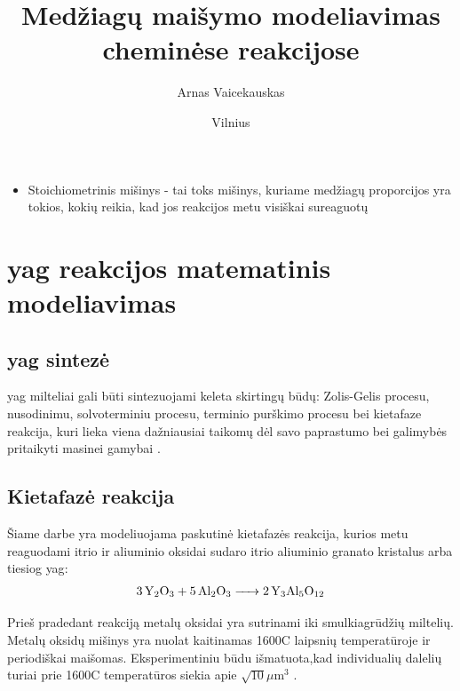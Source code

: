 \documentclass{VUMIFInfKursinis}
\institute{Informatikos institutas}  %
\title{Medžiagų maišymo modeliavimas cheminėse
reakcijose}
\author{Arnas Vaicekauskas}
\date{Vilnius \\ \the\year}
\begin{document}
\maketitle

\tableofcontents


\begin{itemize}
\item Stoichiometrinis mišinys - tai toks mišinys, kuriame medžiagų proporcijos yra tokios, kokių reikia, kad jos reakcijos metu visiškai sureaguotų
\end{itemize}




\section{\acs{yag} reakcijos matematinis modeliavimas}

\subsection{\acs{yag} sintezė}


\acs{yag} milteliai gali būti sintezuojami keleta skirtingų būdų: Zolis-Gelis procesu, nusodinimu, solvoterminiu procesu, terminio purškimo procesu bei kietafaze reakcija, kuri lieka viena dažniausiai taikomų dėl savo paprastumo bei galimybės pritaikyti masinei gamybai \cite{zhangNovelSynthesisYAG2005}.

\subsection{Kietafazė reakcija}

Šiame darbe yra modeliuojama paskutinė kietafazės reakcija, kurios metu reaguodami itrio ir aliuminio oksidai sudaro itrio aliuminio granato kristalus arba tiesiog \acs{yag}:
\begin{align*}
  \ce{3Y_2O_3 + 5Al_2O_3 -> 2Y_3Al_5O_12}
\end{align*}

Prieš pradedant reakciją metalų oksidai yra sutrinami iki smulkiagrūdžių miltelių. Metalų oksidų mišinys yra nuolat kaitinamas 1600\degree C laipsnių temperatūroje ir periodiškai maišomas. Eksperimentiniu būdu išmatuota,kad individualių dalelių turiai prie 1600\degree C temperatūros siekia apie $\sqrt{10}\mu\text{m}^3$ \cite{ivanauskasComputationalModellingYAG2009}.
\end{document}
